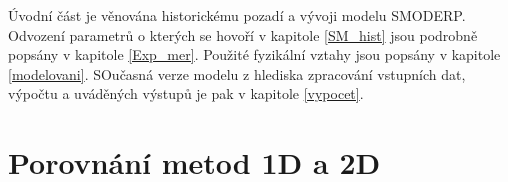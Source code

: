 %

Úvodní část je věnována historickému pozadí a vývoji modelu SMODERP. Odvození parametrů o kterých se hovoří v kapitole \ref{SM_hist} jsou podrobně popsány v kapitole \ref{Exp_mer}. Použité fyzikální vztahy jsou popsány v kapitole \ref{modelovani}. SOučasná verze modelu z hlediska zpracování vstupních dat, výpočtu a uváděných výstupů je pak v kapitole \ref{vypocet}.


\setcounter{section}{0}
\section{Porovnání metod 1D a 2D} \label{porovnani1D2D}


